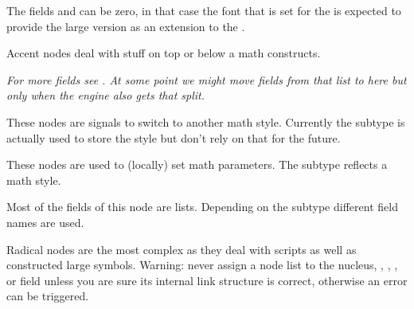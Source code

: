 
The fields  and  can be zero, in that case
the font that is set for the  is expected to provide the large
version as an extension to the .


\stopsubsection

\startsubsection[title={accent}]

Accent nodes deal with stuff on top or below a math constructs.


{\em For more fields see . At some point we might move fields from
that list to here but only when the engine also gets that split.}


\stopsubsection

\startsubsection[title={style}]

These nodes are signals to switch to another math style. Currently the subtype is
actually used to store the style but don't rely on that for the future.



\stopsubsection

\startsubsection[title={parameter}]

These nodes are used to (locally) set math parameters. The subtype reflects a math style.



\stopsubsection

\startsubsection[title={choice}]

Most of the fields of this node are lists. Depending on the subtype different
field names are used.



\stopsubsection

\startsubsection[title={radical}]

Radical nodes are the most complex as they deal with scripts as well as
constructed large symbols. Warning: never assign a node list to the \type
{nucleus}, , , , or  field unless
you are sure its internal link structure is correct, otherwise an error can be
triggered.

